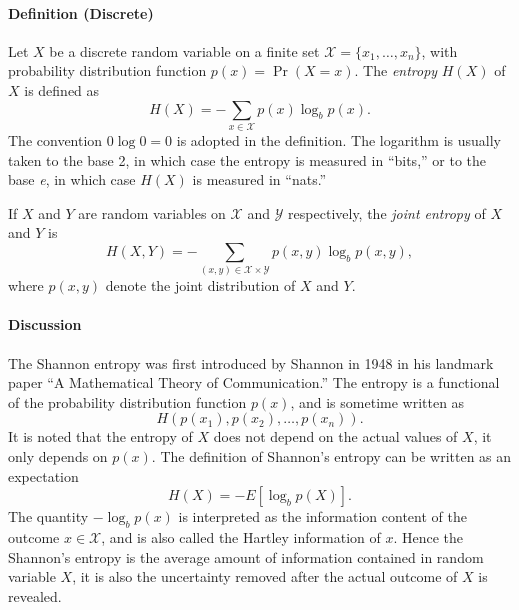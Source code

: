 \documentclass{article}
\begin{document}



\paragraph{Definition (Discrete)}

Let $X$ be a discrete random variable on a finite set
$\mathcal{X}=\{x_1,\ldots,x_n\}$, with probability distribution
function $p(x) = \Pr(X=x)$. The {\em entropy} $H(X)$ of $X$ is
defined as
\begin{equation}
H(X) = -\sum_{x \in \mathcal{X}} p(x) \log_b p(x).
\end{equation}
The convention $0 \log 0 =0$ is adopted in the definition. The
logarithm is usually taken to the base 2, in which case the
entropy is measured in ``bits,'' or to the base {\em e}, in which case
$H(X)$ is measured in ``nats.''

If $X$ and $Y$ are random variables on $\mathcal{X}$ and
$\mathcal{Y}$ respectively, the {\em joint entropy} of $X$ and $Y$
is
\[
  H(X,Y) = -\sum_{(x,y)\in \mathcal{X}\times \mathcal{Y}} p(x,y)
  \log_b p(x,y),
\]
where $p(x,y)$ denote the joint distribution of $X$ and $Y$.

\paragraph{Discussion}
The Shannon entropy was first introduced by Shannon in 1948 in his
landmark paper ``A Mathematical Theory of Communication.'' The
entropy is a functional of the probability distribution function
$p(x)$, and is sometime written as
\[
 H(p(x_1), p(x_2),\ldots, p(x_n)).
\]
It is noted that the entropy of $X$ does not depend on the actual
values of $X$, it only depends on $p(x)$. The definition of
Shannon's entropy can be written as an expectation
\[
  H(X) = -E[\log_b p(X)].
\]
The quantity $-\log_b p(x)$ is interpreted as the information
content of the outcome $x\in\mathcal{X}$, and is also called the Hartley
information of $x$. Hence the Shannon's entropy is the average
amount of information contained in random variable $X$, it is also
the uncertainty removed after the actual outcome of $X$ is
revealed.
\end{document}
